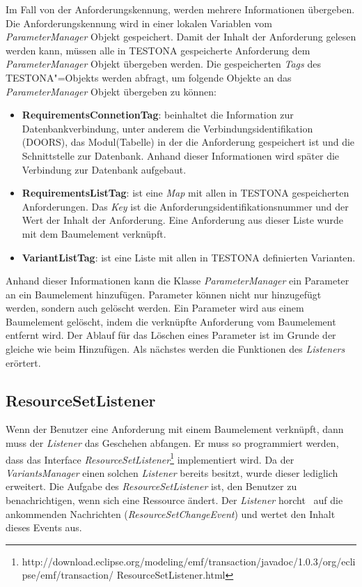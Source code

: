 Im Fall von der Anforderungskennung, werden mehrere Informationen übergeben. Die Anforderungskennung wird in einer lokalen Variablen vom \textit{ParameterManager} Objekt gespeichert. Damit der Inhalt der Anforderung gelesen werden kann, müssen alle in TESTONA gespeicherte Anforderung dem \textit{ParameterManager} Objekt übergeben werden. Die gespeicherten \textit{Tags} des TESTONA"=Objekts werden abfragt, um folgende Objekte an das \textit{ParameterManager} Objekt übergeben zu können:


\begin{itemize}
\item \textbf{RequirementsConnetionTag}: beinhaltet die Information zur Datenbankverbindung, unter anderem die Verbindungsidentifikation (DOORS), das Modul(Tabelle) in der die Anforderung gespeichert ist und die Schnittstelle zur Datenbank. Anhand dieser Informationen wird später die Verbindung zur Datenbank aufgebaut.

\item \textbf{RequirementsListTag}: ist eine \textit{Map} mit allen in TESTONA gespeicherten Anforderungen. Das \textit{Key} ist die Anforderungsidentifikationsnummer und der Wert der Inhalt der Anforderung. Eine Anforderung aus dieser Liste wurde mit dem Baumelement verknüpft.

\item \textbf{VariantListTag}: ist eine Liste mit allen in TESTONA definierten Varianten.
\end{itemize}


Anhand dieser Informationen kann die Klasse \textit{ParameterManager} ein Parameter an ein Baumelement hinzufügen. Parameter können nicht nur hinzugefügt werden, sondern auch gelöscht werden. Ein Parameter wird aus einem Baumelement gelöscht, indem die verknüpfte Anforderung vom Baumelement entfernt wird. Der Ablauf für das Löschen eines Parameter ist im Grunde der gleiche wie beim Hinzufügen. Als nächstes werden die Funktionen des \textit{Listeners} erörtert.




\subsection{ResourceSetListener}\label{sub:RSListner}
Wenn der Benutzer eine Anforderung mit einem Baumelement verknüpft, dann muss der \textit{Listener} das Geschehen abfangen. Er muss so programmiert werden, dass das Interface \textit{ResourceSetListener}\footnote{http://download.eclipse.org/modeling/emf/transaction/javadoc/1.0.3/org/eclipse/emf/transaction/ ResourceSetListener.html} implementiert wird. Da der \textit{VariantsManager} einen solchen \textit{Listener} bereits besitzt, wurde dieser lediglich erweitert. Die Aufgabe des \textit{ResourceSetListener} ist, den Benutzer zu benachrichtigen, wenn sich eine Ressource ändert. Der \textit{Listener}  \glqq horcht\grqq~ auf die ankommenden Nachrichten (\textit{ResourceSetChangeEvent}) und wertet den Inhalt dieses Events aus.\\

